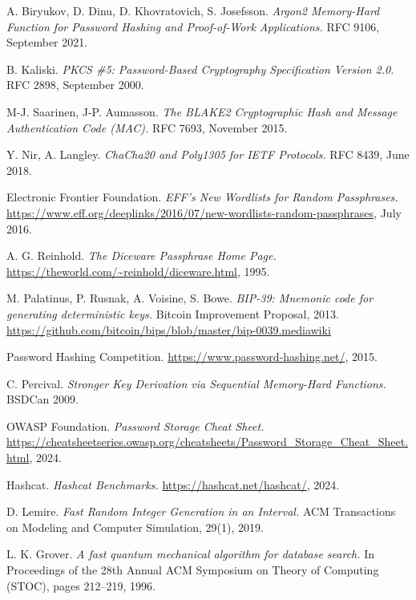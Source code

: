 \documentclass[11pt]{article}
\begin{document}

\begin{thebibliography}{99}

A. Biryukov, D. Dinu, D. Khovratovich, S. Josefsson.
\textit{Argon2 Memory-Hard Function for Password Hashing and Proof-of-Work Applications.}
RFC 9106, September 2021.

B. Kaliski.
\textit{PKCS \#5: Password-Based Cryptography Specification Version 2.0.}
RFC 2898, September 2000.

M-J. Saarinen, J-P. Aumasson.
\textit{The BLAKE2 Cryptographic Hash and Message Authentication Code (MAC).}
RFC 7693, November 2015.

Y. Nir, A. Langley.
\textit{ChaCha20 and Poly1305 for IETF Protocols.}
RFC 8439, June 2018.

Electronic Frontier Foundation.
\textit{EFF's New Wordlists for Random Passphrases.}
\url{https://www.eff.org/deeplinks/2016/07/new-wordlists-random-passphrases}, July 2016.

A. G. Reinhold.
\textit{The Diceware Passphrase Home Page.}
\url{https://theworld.com/~reinhold/diceware.html}, 1995.

M. Palatinus, P. Rusnak, A. Voisine, S. Bowe.
\textit{BIP-39: Mnemonic code for generating deterministic keys.}
Bitcoin Improvement Proposal, 2013.
\url{https://github.com/bitcoin/bips/blob/master/bip-0039.mediawiki}

Password Hashing Competition.
\url{https://www.password-hashing.net/}, 2015.

C. Percival.
\textit{Stronger Key Derivation via Sequential Memory-Hard Functions.}
BSDCan 2009.

OWASP Foundation.
\textit{Password Storage Cheat Sheet.}
\url{https://cheatsheetseries.owasp.org/cheatsheets/Password_Storage_Cheat_Sheet.html}, 2024.

Hashcat.
\textit{Hashcat Benchmarks.}
\url{https://hashcat.net/hashcat/}, 2024.

D. Lemire.
\textit{Fast Random Integer Generation in an Interval.}
ACM Transactions on Modeling and Computer Simulation, 29(1), 2019.

L. K. Grover.
\textit{A fast quantum mechanical algorithm for database search.}
In Proceedings of the 28th Annual ACM Symposium on Theory of Computing (STOC), pages 212--219, 1996.

\end{thebibliography}
\end{document}
